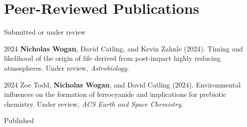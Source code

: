 \documentclass{article}
\begin{document}
\section{Peer-Reviewed Publications}

\noindent Submitted or under review

\begin{cvlist}
\item[2024]
  \textbf{Nicholas Wogan}, David Catling, and Kevin Zahnle (2024). Timing and likelihood of the origin of life derived from post-impact highly reducing atmospheres. Under review, \emph{Astrobiology}.
\item[2024]
  Zoe Todd, \textbf{Nicholas Wogan}, and David Catling (2024). Environmental influences on the formation of ferrocyanide and implications for prebiotic chemistry. Under review, \emph{ACS Earth and Space Chemistry}.
\end{cvlist}

\noindent Published
\end{document}
